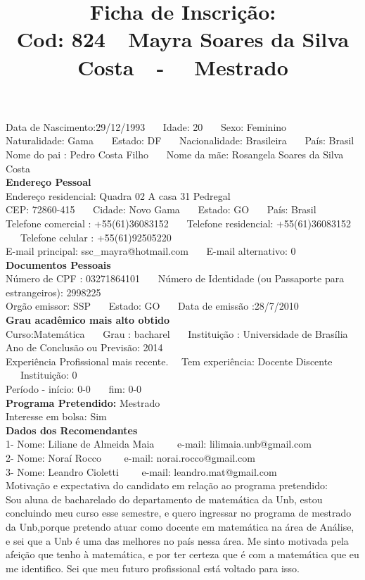 \documentclass[11pt]{article}
\title{\vspace*{-4cm} Ficha de Inscrição: \\Cod: 824\ \ Mayra  Soares da Silva Costa\ \ - \ \ Mestrado 
 }
\date{}
\begin{document}
\maketitle
\vspace*{-1.5cm}
\noindent Data de Nascimento:29/12/1993
\ \ \ Idade: 20   \ \ \ Sexo: Feminino
\\
Naturalidade: Gama  
\ \ \  Estado: DF
\ \ \  Nacionalidade: Brasileira
\ \ \ País: Brasil
\\        
Nome do pai : Pedro Costa Filho
\ \ \ Nome da mãe: Rosangela Soares da Silva Costa          
\\[0.2cm]                     
\textbf{Endereço Pessoal} 
\\ 
\noindent Endereço residencial: Quadra 02 A casa 31 Pedregal
\\
        CEP: 72860-415 
\ \ \ Cidade: Novo Gama 
\ \ \ Estado: GO 
\ \ \ País: Brasil
\\		
		Telefone comercial : +55(61)36083152
\ \ \ Telefone residencial: +55(61)36083152
\ \ \ Telefone celular : +55(61)92505220
\\
E-mail principal: ssc\_mayra@hotmail.com
\ \ \ E-mail alternativo: 0 
\\[0.2cm] 
\textbf{Documentos Pessoais}
\\
\noindent Número de CPF : 03271864101
\ \ \ Número de Identidade (ou Passaporte para estrangeiros): 2998225
\\
Orgão emissor: SSP
\ \ \ Estado: GO
\ \ \ Data de emissão :28/7/2010
\\[0.3cm]
\textbf{Grau acadêmico mais alto obtido}
\\	
Curso:Matemática
\ \ \ Grau : bacharel
\ \ \ Instituição : Universidade de Brasília
\\			
Ano de Conclusão ou Previsão: 2014
\\ 
Experiência Profissional mais recente. \ \  
Tem experiência: Docente Discente  
\ \ \ Instituição: 0
\\  
Período - início: 0-0
\ \ \ fim: 0-0
\\[0.2cm] 
\textbf{Programa Pretendido:} Mestrado\\
Interesse em bolsa: Sim
\\[0.3cm]		
\textbf{Dados dos Recomendantes} 
\\
1- Nome: Liliane de Almeida Maia
\ \ \ \  e-mail: lilimaia.unb@gmail.com 
\\
2- Nome: Noraí Rocco
\ \ \ \ e-mail: norai.rocco@gmail.com
\\
3- Nome: Leandro Cioletti
\ \ \ \ e-mail: leandro.mat@gmail.com
\\[0.2cm]
Motivação e expectativa do candidato em relação ao programa pretendido:
\\Sou aluna de bacharelado do departamento de matemática da Unb, estou concluindo meu curso esse semestre, e quero ingressar no programa de mestrado da Unb,porque pretendo atuar como docente em matemática na área de Análise, e sei que a Unb é uma das melhores no país nessa área. Me sinto motivada pela afeição que tenho à matemática, e por ter certeza que é com a matemática que eu me identifico. Sei que meu futuro profissional está voltado para isso.
\end{document}
